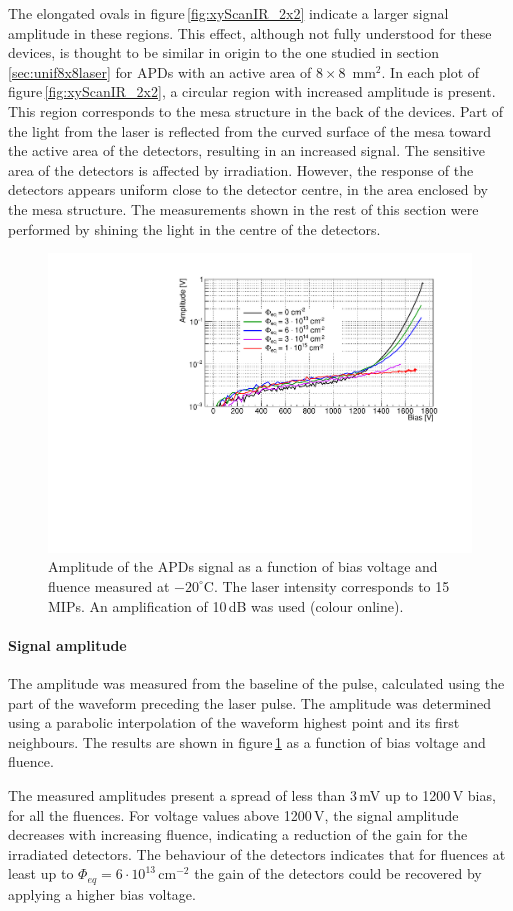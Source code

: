 \documentclass[review,number,sort&compress]{elsarticle}
\begin{document}
The elongated ovals in figure\,\ref{fig:xyScanIR_2x2} indicate a larger signal amplitude in these regions.
This effect, although not fully understood for these devices, is thought to be similar in origin to the one studied in section\,\ref{sec:unif8x8laser} for APDs with an active area of $8 \times 8$~mm$^2$.
In each plot of figure\,\ref{fig:xyScanIR_2x2}, a circular region with increased amplitude is present.
This region corresponds to the mesa structure in the back of the devices.
Part of the light from the laser is reflected from the curved surface of the mesa toward the active area of the detectors, resulting in an increased signal.
The sensitive area of the detectors is affected by irradiation.
However, the response of the detectors appears uniform close to the detector centre, in the area enclosed by the mesa structure.
The measurements shown in the rest of this section were performed by shining the light in the centre of the detectors.

\begin{figure}
  \centering
  \includegraphics[width = 0.6 \columnwidth]{ampliIrrad_5mV}
  \caption{Amplitude of the APDs signal as a function of bias voltage and fluence measured at $-20^\circ$C. The laser intensity corresponds to 15\,MIPs. An amplification of 10\,dB was used (colour online).}
  \label{fig:ampli2x2_15MIP}
\end{figure}

\paragraph{Signal amplitude}
The amplitude was measured from the baseline of the pulse, calculated using the part of the waveform preceding the laser pulse.
The amplitude was determined using a parabolic interpolation of the waveform highest point and its first neighbours.
The results are shown in figure\,\ref{fig:ampli2x2_15MIP} as a function of bias voltage and fluence.

The measured amplitudes present a spread of less than 3\,mV up to 1200\,V bias, for all the fluences.
For voltage values above 1200\,V, the signal amplitude decreases with increasing fluence, indicating a reduction of the gain for the irradiated detectors.
The behaviour of the detectors indicates that for fluences at least up to $\Phi_{eq} = 6 \cdot 10^{13}$\,cm$^{-2}$ the gain of the detectors could be recovered by applying a higher bias voltage.
\end{document}
